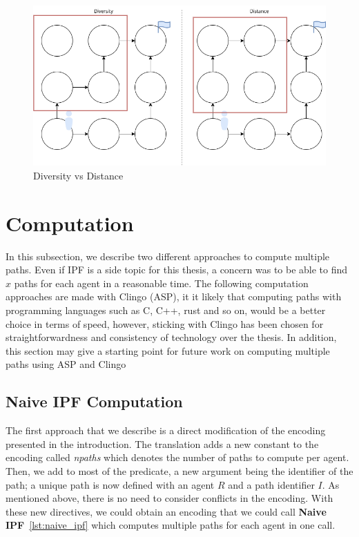 \begin{figure}[H]
    \centering
    \caption{Diversity vs Distance}\label{fig:diversity_vs_distance}
    \includegraphics[width=\widthimg]{img/diversity_vs_distance.drawio.png}
\end{figure}



\section{Computation}


In this subsection, we describe two different approaches to compute multiple paths. Even if IPF is a side topic for this thesis, a concern was to be able to find \(x\) paths for each agent in a reasonable time. The following computation approaches are made with Clingo (ASP), it it likely that computing paths with programming languages such as C, C++, rust and so on, would be a better choice in terms of speed, however, sticking with Clingo has been chosen for straightforwardness and consistency of technology over the thesis. In addition, this section may give a starting point for future work on computing multiple paths using ASP and Clingo

\subsection{Naive IPF Computation}\label{sec:naive_ipf_computation}

The first approach that we describe is a direct modification of the encoding presented in the introduction. The translation adds a new constant to the encoding called \textit{npaths} which denotes the number of paths to compute per agent. Then, we add to most of the predicate, a new argument being the identifier of the path; a unique path is now defined with an agent \(R\) and a path identifier \(I\). As mentioned above, there is no need to consider conflicts in the encoding. With these new directives, we could obtain an encoding that we could call \textbf{Naive IPF}~\ref{lst:naive_ipf} which computes multiple paths for each agent in one call.

